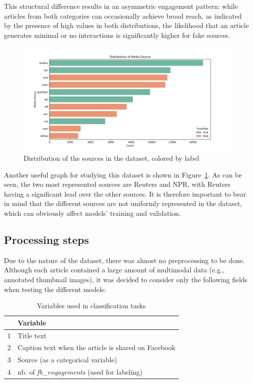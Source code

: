 \documentclass[a4paper,twoside,12pt]{book}
\begin{document}
This structural difference results in an asymmetric engagement pattern: while articles from both categories can occasionally achieve broad reach, as indicated by the presence of high values in both distributions, the likelihood that an article generates minimal or no interactions is significantly higher for fake sources.\\

\begin{figure}[htbp]
	\centering
	\includegraphics[width=\textwidth]{./img/media_source_distribution.png}
	\caption{Distribution of the sources in the dataset, colored by label}
	\label{fig:sources_count}
\end{figure}

Another useful graph for studying this dataset is shown in Figure~\ref{fig:sources_count}. As can be seen, the two most represented sources are Reuters and NPR, with Reuters having a significant lead over the other sources. It is therefore important to bear in mind that the different sources are not uniformly represented in the dataset, which can obviously affect models' training and validation.

\subsection*{Processing steps}
Due to the nature of the dataset, there was almost no preprocessing to be done. Although each article contained a large amount of multimodal data (e.g., annotated thumbnail images), it was decided to consider only the following fields when testing the different models: 

\begin{table}[h]
	\centering
	\begin{tabular}{cl}
		\hline
		 & \textbf{Variable} \\ \hline
		1 & Title text \\
		2 & Caption text when the article is shared on Facebook \\
		3 & Source (as a categorical variable)  \\
		4 & nb. of \textit{fb\_engagements} (used for labeling) \\
		 \hline
	\end{tabular}
	\caption{Variables used in classification tasks}
\end{table}
\end{document}
